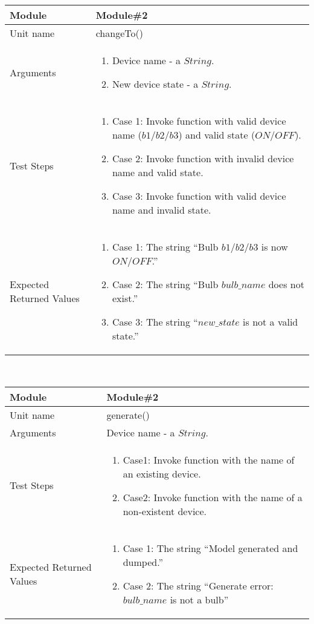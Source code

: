 \begin{tabular}{|p{4cm}|p{9cm}|}
\hline
Module & Module\#2 \\
\hline
Unit name & changeTo() \\
\hline
\vspace*{\baselineskip}Arguments & \begin{enumerate}
\item Device name - a $String$.
\item New device state - a $String$.
\end{enumerate} \\
\hline
\vspace*{\baselineskip}Test Steps & \begin{enumerate}
\item[] Case 1: Invoke function with valid device name ($b1/b2/b3$) and valid state ($ON/OFF$).
\item[] Case 2: Invoke function with invalid device name and valid state.
\item[] Case 3: Invoke function with valid device name and invalid state.
\end{enumerate}\\
\hline
\vspace*{\baselineskip}Expected Returned Values & \begin{enumerate}
\item[] Case 1: The string ``Bulb $b1/b2/b3$ is now $ON/OFF$.''
\item[] Case 2: The string ``Bulb $bulb\_name$ does not exist.''
\item[] Case 3: The string ``$new\_state$ is not a valid state.''
\end{enumerate} \\
\hline
\end{tabular}
\\[2\baselineskip]
%
\begin{tabular}{|p{4cm}|p{9cm}|}
\hline
Module & Module\#2 \\
\hline
Unit name & generate() \\
\hline
Arguments & Device name - a $String$. \\
\hline
\vspace*{\baselineskip}Test Steps & \begin{enumerate}
\item[] Case1: Invoke function with the name of an existing device.
\item[] Case2: Invoke function with the name of a non-existent device.
\end{enumerate}\\
\hline
\vspace*{\baselineskip}Expected Returned Values & \begin{enumerate}
\item[] Case 1: The string ``Model generated and dumped.''
\item[] Case 2: The string ``Generate error: $bulb\_name$ is not a bulb''
\end{enumerate} \\
\hline
\end{tabular}

